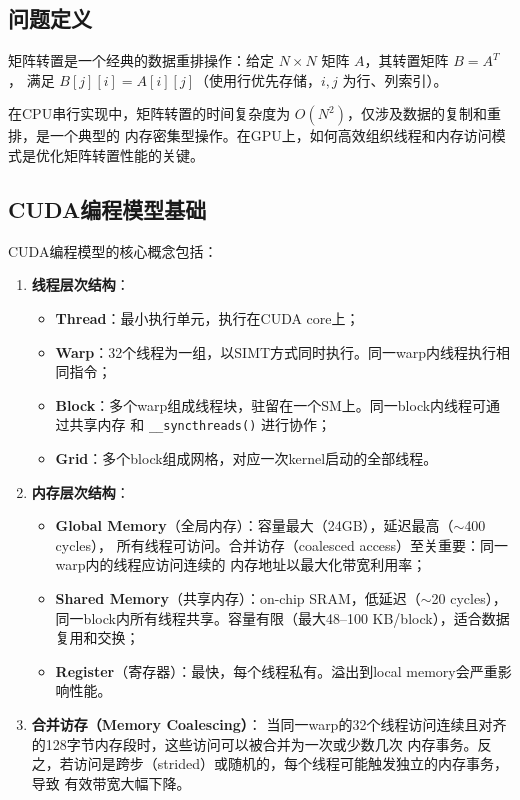 \documentclass[UTF8,a4paper,12pt,fontset=none]{ctexart}
\begin{document}
\subsection{问题定义}

矩阵转置是一个经典的数据重排操作：给定 $N \times N$ 矩阵 $A$，其转置矩阵 $B = A^T$，
满足 $B[j][i] = A[i][j]$（使用行优先存储，$i, j$ 为行、列索引）。

在CPU串行实现中，矩阵转置的时间复杂度为 $O(N^2)$，仅涉及数据的复制和重排，是一个典型的
内存密集型操作。在GPU上，如何高效组织线程和内存访问模式是优化矩阵转置性能的关键。

\subsection{CUDA编程模型基础}

CUDA编程模型的核心概念包括：

\begin{enumerate}[leftmargin=2.2em]
  \item \textbf{线程层次结构}：
        \begin{itemize}
          \item \textbf{Thread}：最小执行单元，执行在CUDA core上；
          \item \textbf{Warp}：32个线程为一组，以SIMT方式同时执行。同一warp内线程执行相同指令；
          \item \textbf{Block}：多个warp组成线程块，驻留在一个SM上。同一block内线程可通过共享内存
                和 \texttt{\_\_syncthreads()} 进行协作；
          \item \textbf{Grid}：多个block组成网格，对应一次kernel启动的全部线程。
        \end{itemize}

  \item \textbf{内存层次结构}：
        \begin{itemize}
          \item \textbf{Global Memory}（全局内存）：容量最大（24GB），延迟最高（$\sim$400 cycles），
                所有线程可访问。合并访存（coalesced access）至关重要：同一warp内的线程应访问连续的
                内存地址以最大化带宽利用率；
          \item \textbf{Shared Memory}（共享内存）：on-chip SRAM，低延迟（$\sim$20 cycles），
                同一block内所有线程共享。容量有限（最大48--100 KB/block），适合数据复用和交换；
          \item \textbf{Register}（寄存器）：最快，每个线程私有。溢出到local memory会严重影响性能。
        \end{itemize}

  \item \textbf{合并访存（Memory Coalescing）}：
        当同一warp的32个线程访问连续且对齐的128字节内存段时，这些访问可以被合并为一次或少数几次
        内存事务。反之，若访问是跨步（strided）或随机的，每个线程可能触发独立的内存事务，导致
        有效带宽大幅下降。
\end{enumerate}
\end{document}
